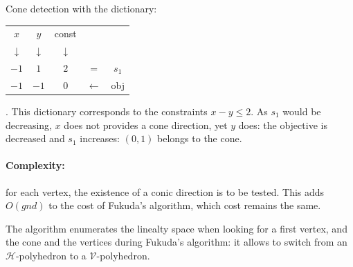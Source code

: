 \begin{example}
\begin{multicols}{2}	
	Cone detection with the dictionary:
	\begin{tabular}{| c | c || c || c c |}
	\hline	
	$x$ & $y$ & const & & \\
	$\downarrow$ & $\downarrow$ &$\downarrow$  & & \\
	\hline
	\hline		
   	$-1$ & $1$ & $2$ & = & $s_1$\\ \hline \hline	
   	$-1$ & $-1$ & $0$ & $\leftarrow$ & obj  \\
   	\hline
   	\end{tabular}. This dictionary corresponds to the constraints $x-y\leq 2$. As $s_1$ would be decreasing, $x$ does not provides a cone direction, yet $y$ does: the objective is decreased and $s_1$ increases: $(0,1)$ belongs to the cone.\\

\columnbreak

\end{multicols}
\label{ex_detec_cone}
\end{example}

\paragraph{Complexity:} for each vertex, the existence of a conic direction is to be tested. This adds $O(gnd)$ to the cost of Fukuda's algorithm, which cost remains the same.

The algorithm enumerates the linealty space when looking for a first vertex, and the cone and the vertices during Fukuda's algorithm: it allows to switch from an $\mathcal{H}$-polyhedron to a $\mathcal{V}$-polyhedron.



